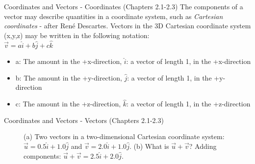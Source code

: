 \documentclass{beamer}
\begin{document}
\begin{frame}{Coordinates and Vectors - Coordinates (Chapters 2.1-2.3)}
\small
The components of a vector may describe quantities in a \alert{coordinate system}, such as \textit{Cartesian coordinates} - after Ren\'e Descartes.  Vectors in the 3D Cartesian coordinate system (x,y,z) may be written in the following notation:
\\
\vspace{0.2cm}
$\boxed{\vec{v} = a\hat{i} + b\hat{j} + c\hat{k}}$
\\
\begin{itemize}
\item a: The amount in the +x-direction, $\hat{i}$: a vector of length 1, in the +x-direction
\item b: The amount in the +y-direction, $\hat{j}$: a vector of length 1, in the +y-direction
\item c: The amount in the +z-direction, $\hat{k}$: a vector of length 1, in the +z-direction
\end{itemize}
\end{frame}

\begin{frame}{Coordinates and Vectors - Vectors (Chapters 2.1-2.3)}
\begin{figure}
\centering
{}
\caption{\label{fig:twovectors} (a) Two vectors in a two-dimensional Cartesian coordinate system: $\vec{u} = 0.5\hat{i}+1.0\hat{j}$ and $\vec{v} = 2.0\hat{i}+1.0\hat{j}$.  (b) What is $\vec{u}+\vec{v}$?  Adding components: $\vec{u}+\vec{v} = 2.5\hat{i}+2.0\hat{j}$.}
\end{figure}
\end{frame}
\end{document}
